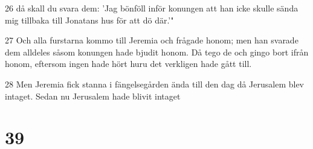 \par 26 då skall du svara dem: 'Jag bönföll inför konungen att han icke skulle sända mig tillbaka till Jonatans hus för att dö där.'"
\par 27 Och alla furstarna kommo till Jeremia och frågade honom; men han svarade dem alldeles såsom konungen hade bjudit honom. Då tego de och gingo bort ifrån honom, eftersom ingen hade hört huru det verkligen hade gått till.
\par 28 Men Jeremia fick stanna i fängelsegården ända till den dag då Jerusalem blev intaget. Sedan nu Jerusalem hade blivit intaget

\chapter{39}

